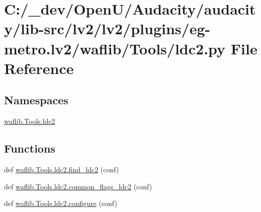 \hypertarget{lv2_2plugins_2eg-metro_8lv2_2waflib_2_tools_2ldc2_8py}{}\section{C\+:/\+\_\+dev/\+Open\+U/\+Audacity/audacity/lib-\/src/lv2/lv2/plugins/eg-\/metro.lv2/waflib/\+Tools/ldc2.py File Reference}
\label{lv2_2plugins_2eg-metro_8lv2_2waflib_2_tools_2ldc2_8py}
\subsection*{Namespaces}
\begin{DoxyCompactItemize}
\item 
 \hyperlink{namespacewaflib_1_1_tools_1_1ldc2}{waflib.\+Tools.\+ldc2}
\end{DoxyCompactItemize}
\subsection*{Functions}
\begin{DoxyCompactItemize}
\item 
def \hyperlink{namespacewaflib_1_1_tools_1_1ldc2_a73aa41d45a6712decaf40b6bc5d35ee5}{waflib.\+Tools.\+ldc2.\+find\+\_\+ldc2} (conf)
\item 
def \hyperlink{namespacewaflib_1_1_tools_1_1ldc2_a183e4e7be481c7c81988655ddc0346d6}{waflib.\+Tools.\+ldc2.\+common\+\_\+flags\+\_\+ldc2} (conf)
\item 
def \hyperlink{namespacewaflib_1_1_tools_1_1ldc2_a930f6047abb96feb45e7391418e486ec}{waflib.\+Tools.\+ldc2.\+configure} (conf)
\end{DoxyCompactItemize}
